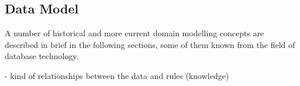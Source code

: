 %
%
%
%
%
%
%

\subsection{Data Model}
\label{data_model_heading}

A number of historical and more current domain modelling concepts are described
in brief in the following sections, some of them known from the field of database
technology.

- kind of relationships between the data and rules (knowledge)





